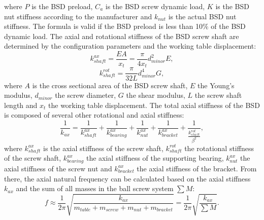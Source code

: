 where $P$ is the BSD preload, $C_{a}$ is the BSD screw dynamic load, $K$ is the BSD nut stiffness according to the manufacturer and $k_{nut}$ is the actual BSD nut stiffness. The formula is valid if the BSD preload is less than 10\% of the BSD dynamic load. The axial and rotational stiffness of the BSD screw shaft are determined by the configuration parameters and the working table displacement:
\begin{equation}
    k_{shaft}^{ax}=\frac{EA}{x_{t}}=\frac{\pi}{4x_{t}}d_{minor}^{2}E,
\end{equation}
\begin{equation}
    k_{shaft}^{rot}=\frac{\pi}{32L}d_{minor}^{4}G,
\end{equation}
 where $A$ is the cross sectional area of the BSD screw shaft, $E$ the Young’s modulus, $d_{minor}$ the screw diameter, $G$ the shear modulus, $L$ the screw shaft length and $x_{t}$ the working table displacement. The total axial stiffness of the BSD is composed of several other rotational and axial stiffness:
 \begin{equation}
    \frac{1}{k_{ax}}=\frac{1}{k_{shaft}^{ax}}+\frac{1}{k_{bearing}^{ax}}+\frac{1}{k_{nut}^{ax}}+\frac{1}{k_{bracket}^{ax}}+\frac{1}{\frac{k_{shaft}^{rot}}{\beta^{2}}},
\end{equation}
where $k_{shaft}^{ax}$ is the axial stiffness of the screw shaft, $k_{shaft}^{rot}$ the rotational stiffness of the screw shaft, $k_{bearing}^{ax}$ the axial stiffness of the supporting bearing, $k_{nut}^{ax}$ the axial stiffness of the screw nut and $k_{bracket}^{ax}$ the axial stiffness of the bracket. From there, the axial natural frequency can be calculated based on the axial stiffness $k_{ax}$ and the sum of all masses in the ball screw system $\sum M$:
\begin{equation}
    f\approx\frac{1}{2\pi}\sqrt{\frac{k_{ax}}{m_{table}+m_{screw}+m_{nut}+m_{bracket}}}=\frac{1}{2\pi}\sqrt{\frac{k_{ax}}{\sum M}}.
\end{equation}

